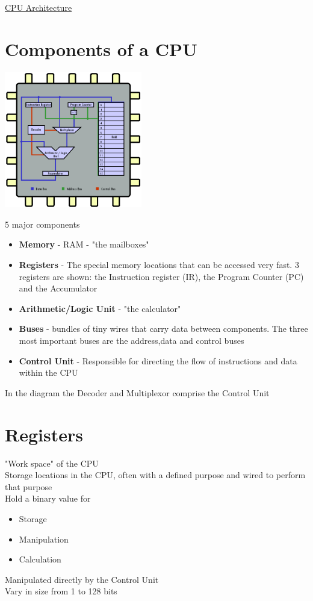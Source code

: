\documentclass{article}[18pt]
\begin{document}
\begin{center}
\underline{\huge CPU Architecture}
\end{center}
\section{Components of a CPU}
\begin{center}
\includegraphics[width=6cm]{cpu_components.jpg}
\end{center}
5 major components
\begin{itemize}
\item \textbf{Memory} - RAM - "the mailboxes"
\item \textbf{Registers} - The special memory locations that can be accessed very fast. 3 registers are shown: the Instruction register (IR), the Program Counter (PC) and the Accumulator
\item \textbf{Arithmetic/Logic Unit} - "the calculator"
\item \textbf{Buses} - bundles of tiny wires that carry data between components. The three most important buses are the address,data and control buses
\item \textbf{Control Unit} - Responsible for directing the flow of instructions and data within the CPU
\end{itemize}
In the diagram the Decoder and Multiplexor comprise the Control Unit
\section{Registers}
"Work space" of the CPU\\
Storage locations in the CPU, often with a defined purpose and wired to perform that purpose\\
Hold a binary value for
\begin{itemize}
\item Storage
\item Manipulation
\item Calculation
\end{itemize}
Manipulated directly by the Control Unit\\
Vary in size from 1 to 128 bits
\end{document}
